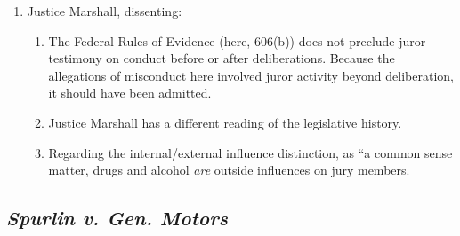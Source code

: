 \begin{enumerate}
\begin{enumerate}
    \end{enumerate}
    \item Justice Marshall, dissenting:
    \begin{enumerate}
        \item The Federal Rules of Evidence (here, 606(b)) does not preclude 
        juror testimony on conduct before or after deliberations. Because the 
        allegations of misconduct here involved juror activity beyond 
        deliberation, it should have been admitted.
        \item Justice Marshall has a different reading of the legislative 
        history.
        \item Regarding the internal/external influence distinction, as ``a 
        common sense matter, drugs and alcohol \emph{are} outside influences 
        on jury members.
    \end{enumerate}
\end{enumerate}

\subsection{\emph{Spurlin v. Gen. Motors}}

